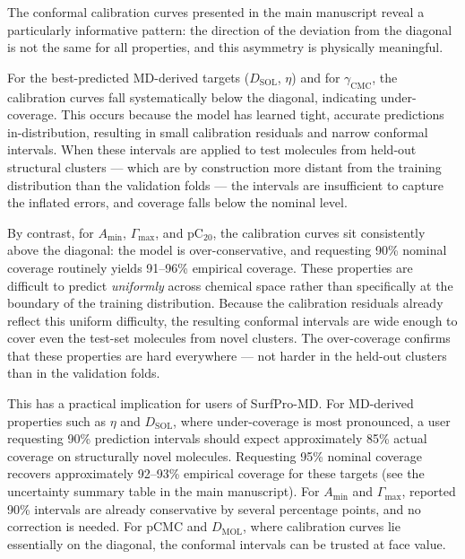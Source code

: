 \documentclass[11pt]{aime}
\begin{document}
The conformal calibration curves presented in the main manuscript reveal a particularly informative pattern: the direction of the deviation from the diagonal is not the same for all properties, and this asymmetry is physically meaningful.

For the best-predicted MD-derived targets ($D_{\mathrm{SOL}}$, $\eta$) and for $\gamma_{\mathrm{CMC}}$, the calibration curves fall systematically below the diagonal, indicating under-coverage.
This occurs because the model has learned tight, accurate predictions in-distribution, resulting in small calibration residuals and narrow conformal intervals.
When these intervals are applied to test molecules from held-out structural clusters --- which are by construction more distant from the training distribution than the validation folds --- the intervals are insufficient to capture the inflated errors, and coverage falls below the nominal level.

By contrast, for $A_{\min}$, $\Gamma_{\max}$, and pC$_{20}$, the calibration curves sit consistently above the diagonal: the model is over-conservative, and requesting 90\% nominal coverage routinely yields 91--96\% empirical coverage.
These properties are difficult to predict \textit{uniformly} across chemical space rather than specifically at the boundary of the training distribution.
Because the calibration residuals already reflect this uniform difficulty, the resulting conformal intervals are wide enough to cover even the test-set molecules from novel clusters.
The over-coverage confirms that these properties are hard everywhere --- not harder in the held-out clusters than in the validation folds.

This has a practical implication for users of SurfPro-MD.
For MD-derived properties such as $\eta$ and $D_{\mathrm{SOL}}$, where under-coverage is most pronounced, a user requesting 90\% prediction intervals should expect approximately 85\% actual coverage on structurally novel molecules.
Requesting 95\% nominal coverage recovers approximately 92--93\% empirical coverage for these targets (see the uncertainty summary table in the main manuscript).
For $A_{\min}$ and $\Gamma_{\max}$, reported 90\% intervals are already conservative by several percentage points, and no correction is needed.
For pCMC and $D_{\mathrm{MOL}}$, where calibration curves lie essentially on the diagonal, the conformal intervals can be trusted at face value.
\end{document}
